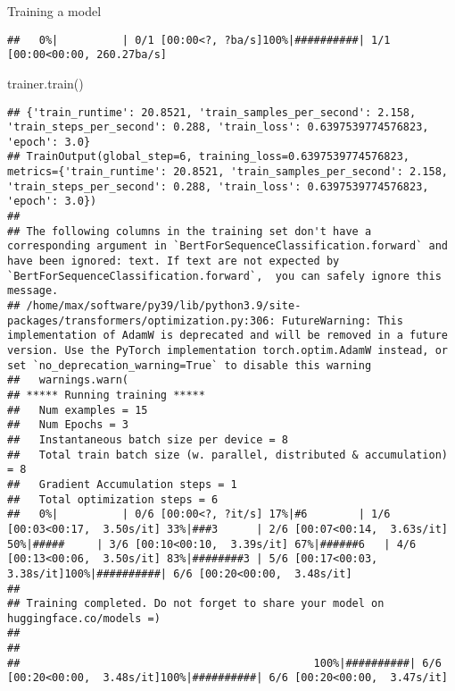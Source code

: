 \documentclass[
  10pt,
  ignorenonframetext,
  aspectratio=169]{beamer}
\newenvironment{Shaded}{\begin{snugshade}}{\end{snugshade}}
\newcommand{\NormalTok}[1]{\textcolor[rgb]{0.80,0.80,0.80}{#1}}
\begin{document}
\begin{frame}[fragile]{Training a model}
\begin{verbatim}
##   0%|          | 0/1 [00:00<?, ?ba/s]100%|##########| 1/1 [00:00<00:00, 260.27ba/s]
\end{verbatim}

\begin{Shaded}
\begin{Highlighting}[]
\NormalTok{trainer.train()}
\end{Highlighting}
\end{Shaded}

\begin{verbatim}
## {'train_runtime': 20.8521, 'train_samples_per_second': 2.158, 'train_steps_per_second': 0.288, 'train_loss': 0.6397539774576823, 'epoch': 3.0}
## TrainOutput(global_step=6, training_loss=0.6397539774576823, metrics={'train_runtime': 20.8521, 'train_samples_per_second': 2.158, 'train_steps_per_second': 0.288, 'train_loss': 0.6397539774576823, 'epoch': 3.0})
## 
## The following columns in the training set don't have a corresponding argument in `BertForSequenceClassification.forward` and have been ignored: text. If text are not expected by `BertForSequenceClassification.forward`,  you can safely ignore this message.
## /home/max/software/py39/lib/python3.9/site-packages/transformers/optimization.py:306: FutureWarning: This implementation of AdamW is deprecated and will be removed in a future version. Use the PyTorch implementation torch.optim.AdamW instead, or set `no_deprecation_warning=True` to disable this warning
##   warnings.warn(
## ***** Running training *****
##   Num examples = 15
##   Num Epochs = 3
##   Instantaneous batch size per device = 8
##   Total train batch size (w. parallel, distributed & accumulation) = 8
##   Gradient Accumulation steps = 1
##   Total optimization steps = 6
##   0%|          | 0/6 [00:00<?, ?it/s] 17%|#6        | 1/6 [00:03<00:17,  3.50s/it] 33%|###3      | 2/6 [00:07<00:14,  3.63s/it] 50%|#####     | 3/6 [00:10<00:10,  3.39s/it] 67%|######6   | 4/6 [00:13<00:06,  3.50s/it] 83%|########3 | 5/6 [00:17<00:03,  3.38s/it]100%|##########| 6/6 [00:20<00:00,  3.48s/it]
## 
## Training completed. Do not forget to share your model on huggingface.co/models =)
## 
## 
##                                              100%|##########| 6/6 [00:20<00:00,  3.48s/it]100%|##########| 6/6 [00:20<00:00,  3.47s/it]
\end{verbatim}
\end{frame}
\end{document}
